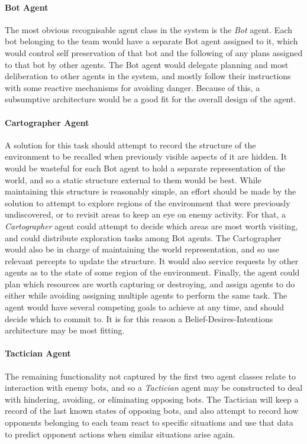 \documentclass[a4paper,10pt]{article}
\begin{document}
\paragraph{Bot Agent}
The most obvious recognisable agent class in the system is the \emph{Bot} agent. Each bot belonging to the team would have a separate Bot agent assigned to it, which would control self preservation of that bot and the following of any plans assigned to that bot by other agents. The Bot agent would delegate planning and most deliberation to other agents in the system, and mostly follow their instructions with some reactive mechanisms for avoiding danger. Because of this, a subsumptive architecture\cite{brooks90} would be a good fit for the overall design of the agent.

\paragraph{Cartographer Agent}
A solution for this task should attempt to record the structure of the environment to be recalled when previously visible aspects of it are hidden. It would be wasteful for each Bot agent to hold a separate representation of the world, and so a static structure external to them would be best. While maintaining this structure is reasonably simple, an effort should be made by the solution to attempt to explore regions of the environment that were previously undiscovered, or to revisit areas to keep an eye on enemy activity. For that, a \emph{Cartographer} agent could attempt to decide which areas are most worth visiting, and could distribute exploration tasks among Bot agents. The Cartographer would also be in charge of maintaining the world representation, and so use relevant percepts to update the structure. It would also service requests by other agents as to the state of some region of the environment. Finally, the agent could plan which resources are worth capturing or destroying, and assign agents to do either while avoiding assigning multiple agents to perform the same task. The agent would have several competing goals to achieve at any time, and should decide which to commit to. It is for this reason a Belief-Desires-Intentions\cite{rao95} architecture may be most fitting.

\paragraph{Tactician Agent}
The remaining functionality not captured by the first two agent classes relate to interaction with enemy bots, and so a \emph{Tactician} agent may be constructed to deal with hindering, avoiding, or eliminating opposing bots. The Tactician will keep a record of the last known states of opposing bots, and also attempt to record how opponents belonging to each team react to specific situations and use that data to predict opponent actions when similar situations arise again.
\end{document}
